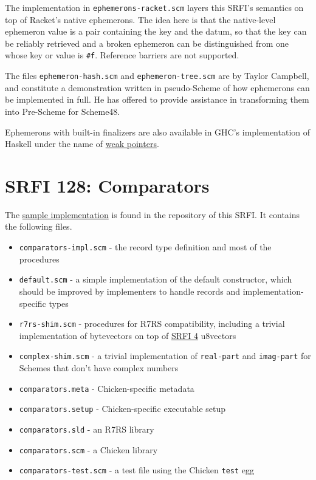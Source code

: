 The implementation in \texttt{ephemerons-racket.scm} layers this SRFI's
semantics on top of Racket's native ephemerons. The idea here is that
the native-level ephemeron value is a pair containing the key and the
datum, so that the key can be reliably retrieved and a broken ephemeron
can be distinguished from one whose key or value is \texttt{\#f}.
Reference barriers are not supported.

The files \texttt{ephemeron-hash.scm} and \texttt{ephemeron-tree.scm}
are by Taylor Campbell, and constitute a demonstration written in
pseudo-Scheme of how ephemerons can be implemented in full. He has
offered to provide assistance in transforming them into Pre-Scheme for
Scheme48.

Ephemerons with built-in finalizers are also available in GHC's
implementation of Haskell under the name of
\href{https://hackage.haskell.org/package/base-4.8.1.0/docs/System-Mem-Weak.html}{weak
pointers}.

\section{SRFI 128: Comparators}
The \href{comparators.tar.gz}{sample implementation} is found in the
repository of this SRFI. It contains the following files.

\begin{itemize}
\tightlist
\item
  \texttt{comparators-impl.scm} - the record type definition and most of
  the procedures
\item
  \texttt{default.scm} - a simple implementation of the default
  constructor, which should be improved by implementers to handle
  records and implementation-specific types
\item
  \texttt{r7rs-shim.scm} - procedures for R7RS compatibility, including
  a trivial implementation of bytevectors on top of
  \href{http://srfi.schemers.org/srfi-4/srfi-4.html}{SRFI 4} u8vectors
\item
  \texttt{complex-shim.scm} - a trivial implementation of
  \texttt{real-part} and \texttt{imag-part} for Schemes that don't have
  complex numbers
\item
  \texttt{comparators.meta} - Chicken-specific metadata
\item
  \texttt{comparators.setup} - Chicken-specific executable setup
\item
  \texttt{comparators.sld} - an R7RS library
\item
  \texttt{comparators.scm} - a Chicken library
\item
  \texttt{comparators-test.scm} - a test file using the Chicken
  \texttt{test} egg
\end{itemize}

